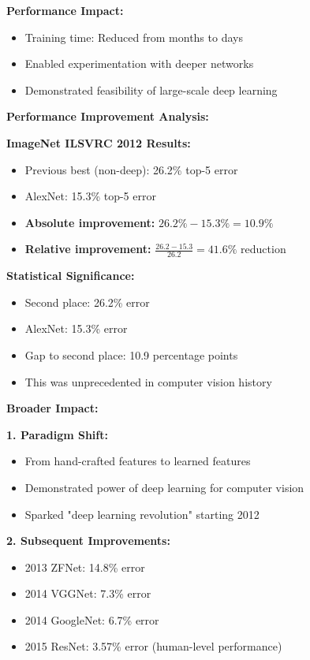 \documentclass[12pt]{article}
\begin{document}
\begin{enumerate}[(a)]
{    \textbf{Performance Impact:}
    \begin{itemize}
        \item Training time: Reduced from months to days
        \item Enabled experimentation with deeper networks
        \item Demonstrated feasibility of large-scale deep learning
    \end{itemize}
    
    \textbf{Performance Improvement Analysis:}
    
    \textbf{ImageNet ILSVRC 2012 Results:}
    \begin{itemize}
        \item Previous best (non-deep): 26.2\% top-5 error
        \item AlexNet: 15.3\% top-5 error
        \item \textbf{Absolute improvement:} $26.2\% - 15.3\% = 10.9\%$
        \item \textbf{Relative improvement:} $\frac{26.2 - 15.3}{26.2} = 41.6\%$ reduction
    \end{itemize}
    
    \textbf{Statistical Significance:}
    \begin{itemize}
        \item Second place: 26.2\% error
        \item AlexNet: 15.3\% error  
        \item Gap to second place: 10.9 percentage points
        \item This was unprecedented in computer vision history
    \end{itemize}
    
    \textbf{Broader Impact:}
    
    \textbf{1. Paradigm Shift:}
    \begin{itemize}
        \item From hand-crafted features to learned features
        \item Demonstrated power of deep learning for computer vision
        \item Sparked "deep learning revolution" starting 2012
    \end{itemize}
    
    \textbf{2. Subsequent Improvements:}
    \begin{itemize}
        \item 2013 ZFNet: 14.8\% error
        \item 2014 VGGNet: 7.3\% error
        \item 2014 GoogleNet: 6.7\% error
        \item 2015 ResNet: 3.57\% error (human-level performance)
    \end{itemize}
    
}
\end{enumerate}
\end{document}
